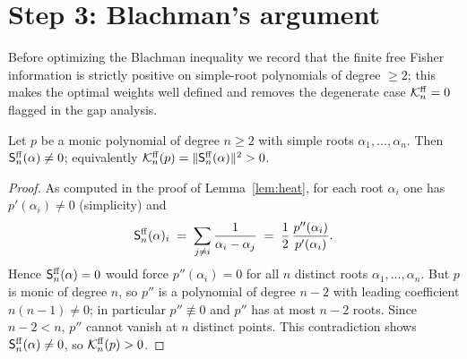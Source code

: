 \section*{Step 3: Blachman's argument}

Before optimizing the Blachman inequality we record that the finite free Fisher
information is strictly positive on simple-root polynomials of degree $\ge2$; this
makes the optimal weights well defined and removes the degenerate case
$\mathcal{K}^{\mathrm{ff}}_n=0$ flagged in the gap analysis.

\begin{qfourlemma}\label{lem:positive}
Let $p$ be a monic polynomial of degree $n\ge2$ with simple roots
$\alpha_1,\dots,\alpha_n$. Then $\mathsf{S}^{\mathrm{ff}}_n(\alpha)\ne0$; equivalently
$\mathcal{K}^{\mathrm{ff}}_n(p)=\|\mathsf{S}^{\mathrm{ff}}_n(\alpha)\|^2>0$.
\end{qfourlemma}

\begin{proof}
As computed in the proof of Lemma~\ref{lem:heat}, for each root $\alpha_i$ one has
$p'(\alpha_i)\ne0$ (simplicity) and
\[
\mathsf{S}^{\mathrm{ff}}_n(\alpha)_i\;=\;\sum_{j\ne i}\frac{1}{\alpha_i-\alpha_j}
\;=\;\frac{1}{2}\,\frac{p''(\alpha_i)}{p'(\alpha_i)} .
\]
Hence $\mathsf{S}^{\mathrm{ff}}_n(\alpha)=0$ would force $p''(\alpha_i)=0$ for all $n$ distinct
roots $\alpha_1,\dots,\alpha_n$. But $p$ is monic of degree $n$, so $p''$ is a
polynomial of degree $n-2$ with leading coefficient $n(n-1)\ne0$; in particular
$p''\not\equiv0$ and $p''$ has at most $n-2$ roots. Since $n-2<n$, $p''$ cannot
vanish at $n$ distinct points. This contradiction shows $\mathsf{S}^{\mathrm{ff}}_n(\alpha)\ne0$,
so $\mathcal{K}^{\mathrm{ff}}_n(p)>0$.
\end{proof}


